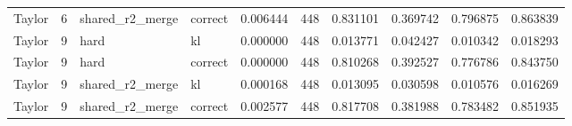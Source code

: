 \begin{tabular}{lrllrrrrrr}
Taylor & 6 & shared_r2_merge & correct & 0.006444 & 448 & 0.831101 & 0.369742 & 0.796875 & 0.863839 \\
Taylor & 9 & hard & kl & 0.000000 & 448 & 0.013771 & 0.042427 & 0.010342 & 0.018293 \\
Taylor & 9 & hard & correct & 0.000000 & 448 & 0.810268 & 0.392527 & 0.776786 & 0.843750 \\
Taylor & 9 & shared_r2_merge & kl & 0.000168 & 448 & 0.013095 & 0.030598 & 0.010576 & 0.016269 \\
Taylor & 9 & shared_r2_merge & correct & 0.002577 & 448 & 0.817708 & 0.381988 & 0.783482 & 0.851935 \\
\bottomrule
\end{tabular}
